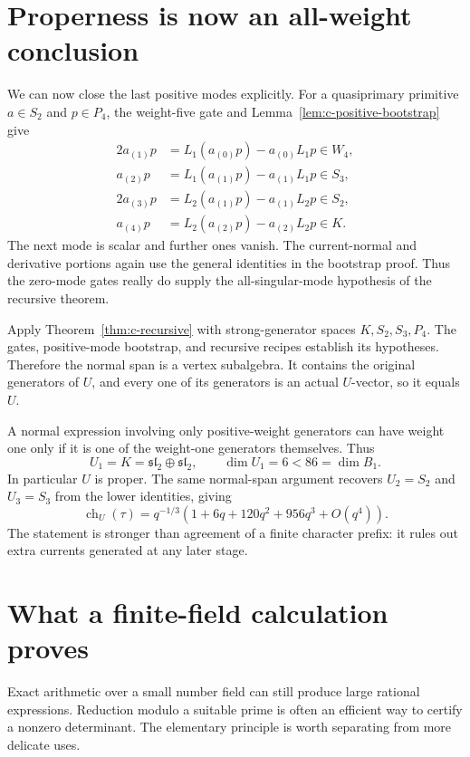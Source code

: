 \section{Properness is now an all-weight conclusion}

We can now close the last positive modes explicitly. For a
quasiprimary primitive $a\in S_2$ and $p\in P_4$, the
weight-five gate and Lemma~\ref{lem:c-positive-bootstrap} give
\begin{align*}
 2a_{(1)}p&=L_1(a_{(0)}p)-a_{(0)}L_1p\in W_4,\\
 a_{(2)}p&=L_1(a_{(1)}p)-a_{(1)}L_1p\in S_3,\\
 2a_{(3)}p&=L_2(a_{(1)}p)-a_{(1)}L_2p\in S_2,\\
 a_{(4)}p&=L_2(a_{(2)}p)-a_{(2)}L_2p\in K.
\end{align*}
The next mode is scalar and further ones vanish. The current-normal
and derivative portions again use the general identities in the
bootstrap proof. Thus the zero-mode gates really do supply the
all-singular-mode hypothesis of the recursive theorem.

Apply Theorem~\ref{thm:c-recursive} with strong-generator spaces
$K,S_2,S_3,P_4$. The gates, positive-mode bootstrap, and recursive
recipes establish its hypotheses. Therefore the normal span is a
vertex subalgebra. It contains the original generators of $U$, and
every one of its generators is an actual $U$-vector, so it equals $U$.

A normal expression involving only positive-weight generators can have
weight one only if it is one of the weight-one generators themselves.
Thus
\begin{equation}\label{eq:c-properness}
 U_1=K=\mathfrak{sl}_2\oplus\mathfrak{sl}_2,
 \qquad\dim U_1=6<86=\dim B_1.
\end{equation}
In particular $U$ is proper. The same normal-span argument recovers
$U_2=S_2$ and $U_3=S_3$ from the lower identities, giving
\[
 \operatorname{ch}_U(\tau)=q^{-1/3}
       (1+6q+120q^2+956q^3+O(q^4)).
\]
The statement is stronger than agreement of a finite character prefix:
it rules out extra currents generated at any later stage.

\section{What a finite-field calculation proves}

Exact arithmetic over a small number field can still produce large
rational expressions. Reduction modulo a suitable prime is often an
efficient way to certify a nonzero determinant. The elementary
principle is worth separating from more delicate uses.

